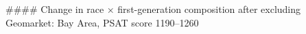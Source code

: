 #### Change in race × first-generation composition after excluding Geomarket: Bay Area, PSAT score 1190–1260
